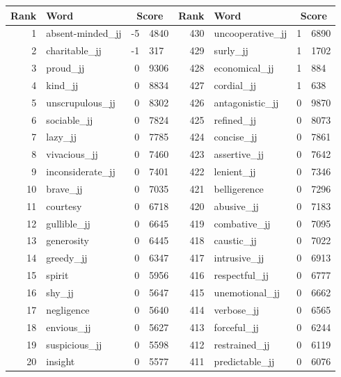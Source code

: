 \begin{table}[tbp]
    \begin{tabular}{| rlr@{.}l | rlr@{.}l |}
    \hline
    \textbf{Rank} & \textbf{Word} & \multicolumn{2}{c|}{\textbf{Score}} & \textbf{Rank} & \textbf{Word} & \multicolumn{2}{c|}{\textbf{Score}} \\
    \hline
    1 & absent-minded\_jj & -5 & 4840    &    430 & uncooperative\_jj & 1 & 6890 \\
    2 & charitable\_jj & -1 & 317    &    429 & surly\_jj & 1 & 1702 \\
    3 & proud\_jj & 0 & 9306    &    428 & economical\_jj & 1 & 884 \\
    4 & kind\_jj & 0 & 8834    &    427 & cordial\_jj & 1 & 638 \\
    5 & unscrupulous\_jj & 0 & 8302    &    426 & antagonistic\_jj & 0 & 9870 \\
    6 & sociable\_jj & 0 & 7824    &    425 & refined\_jj & 0 & 8073 \\
    7 & lazy\_jj & 0 & 7785    &    424 & concise\_jj & 0 & 7861 \\
    8 & vivacious\_jj & 0 & 7460    &    423 & assertive\_jj & 0 & 7642 \\
    9 & inconsiderate\_jj & 0 & 7401    &    422 & lenient\_jj & 0 & 7346 \\
    10 & brave\_jj & 0 & 7035    &    421 & belligerence & 0 & 7296 \\
    11 & courtesy & 0 & 6718    &    420 & abusive\_jj & 0 & 7183 \\
    12 & gullible\_jj & 0 & 6645    &    419 & combative\_jj & 0 & 7095 \\
    13 & generosity & 0 & 6445    &    418 & caustic\_jj & 0 & 7022 \\
    14 & greedy\_jj & 0 & 6347    &    417 & intrusive\_jj & 0 & 6913 \\
    15 & spirit & 0 & 5956    &    416 & respectful\_jj & 0 & 6777 \\
    16 & shy\_jj & 0 & 5647    &    415 & unemotional\_jj & 0 & 6662 \\
    17 & negligence & 0 & 5640    &    414 & verbose\_jj & 0 & 6565 \\
    18 & envious\_jj & 0 & 5627    &    413 & forceful\_jj & 0 & 6244 \\
    19 & suspicious\_jj & 0 & 5598    &    412 & restrained\_jj & 0 & 6119 \\
    20 & insight & 0 & 5577    &    411 & predictable\_jj & 0 & 6076 \\

\end{tabular}
\end{table}
